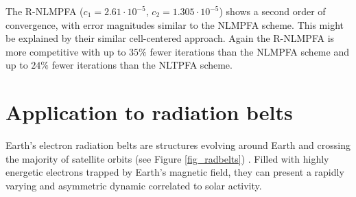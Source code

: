 \documentclass[final,11pt]{elsarticle}
\begin{document}
The R-NLMPFA ($c_1=2.61\cdot 10^{-5}$, $c_2=1.305\cdot 10^{-5}$) shows a second order of convergence, with error magnitudes similar to the NLMPFA scheme. This might be explained by their similar cell-centered approach. Again the R-NLMPFA is more competitive with up to $35\%$ fewer iterations than the NLMPFA scheme and up to $24\%$ fewer iterations than the NLTPFA scheme.




\section{Application to radiation belts}
\label{sec:radbelt}
Earth's electron radiation belts are structures evolving around Earth and crossing the majority of satellite orbits (see Figure \ref{fig_radbelts}) \cite{horne2013}. Filled with highly energetic electrons trapped by Earth's magnetic field, they can present a rapidly varying and asymmetric dynamic correlated to solar activity.
\end{document}
